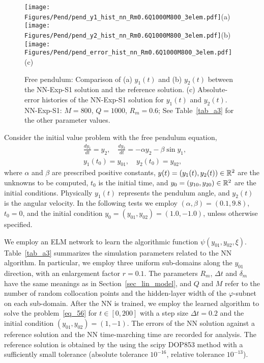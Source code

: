\begin{figure}
  \centerline{
    \texttt{[image: Figures/Pend/pend\_y1\_hist\_nn\_Rm0.6Q1000M800\_3elem.pdf]}(a)
    \texttt{[image: Figures/Pend/pend\_y2\_hist\_nn\_Rm0.6Q1000M800\_3elem.pdf]}(b)
    \texttt{[image: Figures/Pend/pend\_error\_hist\_nn\_Rm0.6Q1000M800\_3elem.pdf]}(c)
  }
  \caption{Free pendulum: Comparison 
    of (a) $y_1(t)$ and (b) $y_2(t)$ between the NN-Exp-S1 solution and the reference
    solution. (c) Absolute-error histories of the NN-Exp-S1 solution for
    $y_1(t)$ and $y_2(t)$.
    NN-Exp-S1: $M=800$, $Q=1000$, $R_m=0.6$; See Table~\ref{tab_a3} for the other
    parameter values.
  }
  \label{fg_9}
\end{figure}

Consider the initial value problem with the free pendulum equation,
\begin{subequations}\label{eq_56}
  \begin{align}
    &
    \frac{dy_1}{dt} = y_2, \quad
    \frac{dy_2}{dt} = -\alpha y_2 - \beta \sin y_1, \\
    &
    y_1(t_0) = y_{01}, \quad y_2(t_0) = y_{02},
  \end{align}
\end{subequations}
where $\alpha$ and $\beta$ are prescribed positive constants,
$y(t) = (y_1(t), y_2(t))\in\mathbb{R}^2$ are the unknowns to be
computed, $t_0$ is the initial time, and
$y_0=(y_{10},y_{20})\in\mathbb{R}^2$ are the initial conditions.
Physically $y_1(t)$ represents the pendulum angle, and $y_2(t)$
is the angular velocity.
In the following tests we employ $(\alpha,\beta)=(0.1,9.8)$, $t_0=0$, and
the initial condition $y_0=(y_{01},y_{02})=(1.0,-1.0)$, unless otherwise specified.


We employ an ELM network to learn the algorithmic function $\psi(y_{01},y_{02},\xi)$.
Table~\ref{tab_a3} summarizes the simulation parameters related to the NN algorithm.
In particular, we employ three uniform sub-domains along the $y_{01}$ direction,
with an enlargement factor $r=0.1$. The parameters $R_m$, $\Delta t$ and $\delta_m$
have the same meanings as in Section~\ref{sec_lin_model}, and $Q$ and $M$ refer to
the number of random collocation points and the hidden-layer width
of the $\varphi$-subnet on each sub-domain.
After the NN is trained, we employ the learned algorithm to solve
the problem~\eqref{eq_56} for $t\in[0,200]$ with a step size
$\Delta t=0.2$ and the initial condition $(y_{01},y_{02})=(1,-1)$.
The errors of the NN solution against a reference solution and the NN time-marching
time are recorded for analysis.
The reference solution is obtained by the using the scipy DOP853 method
with a sufficiently small tolerance (absolute tolerance $10^{-16}$, relative tolerance $10^{-13}$).


